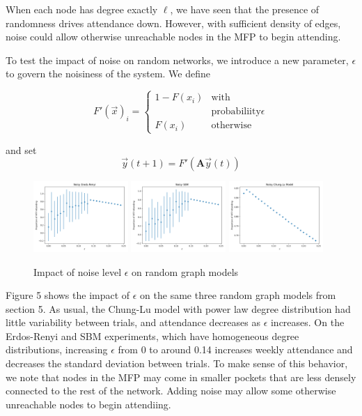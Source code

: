 \documentclass[12pt]{article}
\begin{document}
When each node has degree exactly $\ell$, we have seen that the presence of randomness drives attendance down.  However, with sufficient density of edges, noise could allow otherwise unreachable nodes in the MFP to begin attending.

To test the impact of noise on random networks, we introduce a new parameter, $\epsilon$ to govern the noisiness of the system.  We define

\begin{equation}
  F'(\vec{x})_i = \begin{cases}
    1 - F(x_i) &\text{with} \\
    & \text{probabiliity} \epsilon \\
    F(x_i) &\text{otherwise}
  \end{cases}
\end{equation}

and set
\begin{equation}
  \vec{y}(t + 1) = F'(\mathbf{A}\vec{y}(t))
\end{equation}

\begin{figure}
  \includegraphics[width=0.32\textwidth]{noisy_erdos_renyi.png}
  \includegraphics[width=0.32\textwidth]{noisy_sbm.png}
  \includegraphics[width=0.32\textwidth]{noisy_chung_lu.png}
  \caption{Impact of noise level $\epsilon$ on random graph models}
\end{figure}

Figure 5 shows the impact of $\epsilon$ on the same three random graph models from section 5.  As usual, the Chung-Lu model with power law degree distribution had little variability between trials, and attendance decreases as $\epsilon$ increases.  On the Erdos-Renyi and SBM experiments, which have homogeneous degree distributions, increasing $\epsilon$ from 0 to around 0.14 increases weekly attendance and decreases the standard deviation between trials.  To make sense of this behavior, we note that nodes in the MFP may come in smaller pockets that are less densely connected to the rest of the network.  Adding noise may allow some otherwise unreachable nodes to begin attendiing. 
\end{document}
